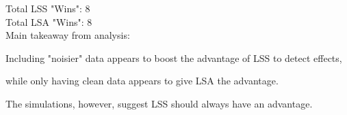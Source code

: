 \documentclass[10pt,letterpaper]{article}
\newlength\savedwidth
\newcommand\thickhline{\noalign{\global\savedwidth\arrayrulewidth\global\arrayrulewidth 2pt}%
\hline
\noalign{\global\arrayrulewidth\savedwidth}}
\newcommand{\lorem}{{\bf LOREM}}
\newcommand{\ipsum}{{\bf IPSUM}}
\begin{document}
Total LSS "Wins": 8\\
Total LSA "Wins": 8\\

Main takeaway from analysis:

Including "noisier" data appears to boost
the advantage of LSS to detect effects,

while only having clean data appears to give
LSA the advantage.

The simulations, however, suggest LSS should
always have an advantage.



\end{document}
